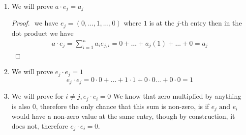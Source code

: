 \documentclass[11pt]{book}
\begin{document}
\begin{enumerate}
\begin{proof}
\begin{gather*}
        \sqrt{4\left( a \cdot b \right) ^2 }  - 4\left\Vert a \right\Vert ^2 \left\Vert b \right\Vert ^2 \le 0\\
        4\left( a \cdot b \right) ^2  - 4\left\Vert a \right\Vert ^2 \left\Vert b \right\Vert ^2 \le 0\\
        \left( a \cdot b \right) ^2 \le \left\Vert a \right\Vert ^2 \left\Vert b \right\Vert ^2 \\
        \left| a \cdot b \right| \le \left\Vert a \right\Vert \left\Vert b \right\Vert 
    \end{gather*}
    \end{proof}
    \item We will prove $a \cdot e_{j} = a_{j} $ 
        \begin{proof}
        $ $\newline
        we have $e_{j} = \left( 0, \ldots , 1, \ldots , 0 \right) $ where $1$ is at the $j$-th entry then in the dot product we have 
        \begin{align*}
            a \cdot e_{j} = \sum_{i=1}^{n} a_{i} e_{j,i} = 0  + \ldots  + a_{j} \left( 1 \right)  + \ldots  + 0=  a_{j} 
        \end{align*}
        \end{proof}
    \item We will prove $e_{j}  \cdot e_{j} = 1$ 
        \[
            e_{j}  \cdot e_{j} = 0  \cdot 0  +  \ldots   + 1 \cdot 1  + 0 \cdot 0 \ldots  + 0 \cdot 0 = 1
        \]
    \item We will prove for $i \neq j, e_{j}  \cdot e_{i} = 0$ 
        We know that zero multiplied by anything is also 0, therefore the only chance that this sum is non-zero, is if $e_{j} \text{ and } e_{i} $ would have a non-zero value at the same entry, though by construction, it does not, therefore $e_{j}  \cdot e_{i} = 0$.
\end{enumerate}

\end{document}
